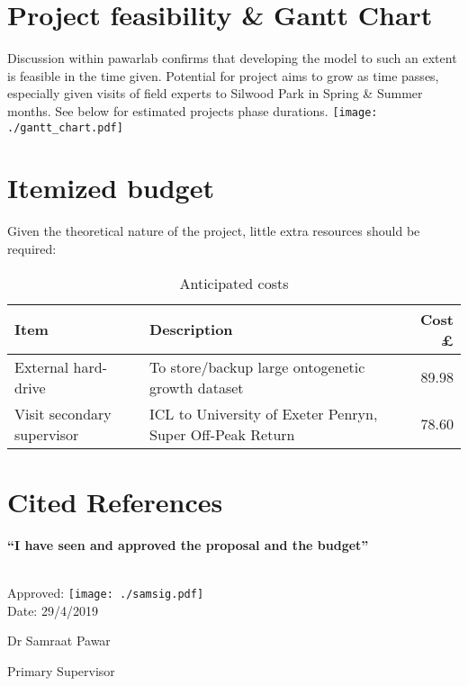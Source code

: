 \documentclass[11pt]{article}
\begin{document}
    \section{Project feasibility \& Gantt Chart}
        Discussion within pawarlab confirms that developing the model to such an extent is feasible in the time given. Potential for project aims to grow as time passes, especially given visits of field experts to Silwood Park in Spring \& Summer months. See below for estimated projects phase durations.
        \vspace{3mm}
        \texttt{[image: ./gantt\_chart.pdf]}
    \section{Itemized budget}
        Given the theoretical nature of the project, little extra resources should be required:
        \begin{table}[ht]
            \caption{Anticipated costs}
            \begin{tabular}{|l|l|r|}
            \hline
            \textbf{Item}              & \textbf{Description}                                      & \textbf{Cost \pounds} \\ \hline
            External hard-drive        & To store/backup large ontogenetic growth dataset          & 89.98         \\ \hline
            Visit secondary supervisor & ICL to University of Exeter Penryn, Super Off-Peak Return & 78.60         \\ \hline
            \end{tabular}
        \end{table}
    \section{Cited References}




\newpage

\large{\textbf{``I have seen and approved the proposal and the budget''}} \\ \\
\normalsize{
Approved: \texttt{[image: ./samsig.pdf]} \\

\hspace*{0mm}\phantom{Approved: }Date: 29/4/2019

\hspace*{0mm}\phantom{Approved: }Dr Samraat Pawar

\hspace*{0mm}\phantom{Approved: }Primary Supervisor
}
\end{document}
